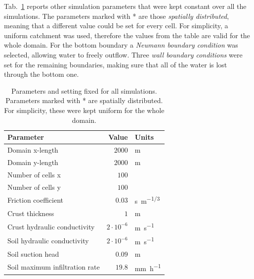 Tab.~\ref{tab:simulations_parameters} reports other simulation parameters that were kept constant over all the simulations.
The parameters marked with * are those \emph{spatially distributed}, meaning that a different value could be set for every cell.
For simplicity, a uniform catchment was used, therefore the values from the table are valid for the whole domain.
For the bottom boundary a \textit{Neumann boundary condition} was selected, allowing water to freely outflow.
Three \textit{wall boundary conditions} were set for the remaining boundaries, making sure that all of the water is lost through the bottom one.

\begin{table}[h]
  \centering
  \caption{Parameters and setting fixed for all simulations. Parameters marked with * are spatially distributed. For simplicity, these were kept uniform for the whole domain.}
  \label{tab:simulations_parameters}
  \begin{threeparttable}
    \begin{tabular}{lrl}
      \toprule
      \textbf{Parameter} & \textbf{Value} & \textbf{Units} \\
      \midrule
      Domain x-length                          &    $\num{2000}$           & \si{\meter}   \\
      Domain y-length                          &    $\num{2000}$           & \si{\meter}   \\
      Number of cells x                        &    $100$             &    \\
      Number of cells y                        &    $100$             &    \\
      Friction coefficient\tnote{*}            &    $0.03$            & \si{s.m^{-1/3}}\\
      Crust thickness\tnote{*}                 &    $1$               & \si{\meter}\\
      Crust hydraulic conductivity\tnote{*}    &    $2\cdot 10^{-6}$  & \si{\meter\per\second}\\
      Soil hydraulic conductivity\tnote{*}     &    $2\cdot 10^{-6}$  & \si{\meter\per\second}\\
      Soil suction head\tnote{*}               &    $0.09$      & \si{\meter}\\
      Soil maximum infiltration rate\tnote{*}  &    $19.8$      & \si{\milli\meter\per\hour}\\
      \bottomrule
    \end{tabular}
  \end{threeparttable}
\end{table}


